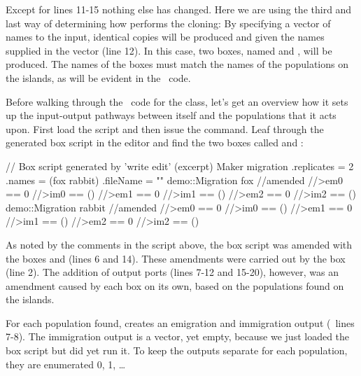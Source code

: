 Except for lines 11-15 nothing else has changed. Here we are using the third and last way of determining how  performs the cloning: By specifying a vector of names to the  input, identical copies will be produced and given the names supplied in the vector (line 12). In this case, two  boxes, named  and , will be produced. The names of the  boxes must match the names of the populations on the islands, as will be evident in the \CPP\ code.

Before walking through the \CPP\ code for the  class, let's get an overview how it sets up the input-output pathways between itself and the populations that it acts upon. First load the  script and then issue the  command. Leaf through the generated box script in the editor and find the two  boxes called  and :

\lstset{numbers=left}
\begin{boxscript}
// Box script generated by 'write edit' (excerpt)
Maker migration{
	.replicates = 2
	.names = (fox rabbit)
	.fileName = ""
	demo::Migration fox{ //amended
		//>em0 == 0
		//>im0 == ()
		//>em1 == 0
		//>im1 == ()
		//>em2 == 0
		//>im2 == ()
	}
	demo::Migration rabbit{ //amended
		//>em0 == 0
		//>im0 == ()
		//>em1 == 0
		//>im1 == ()
		//>em2 == 0
		//>im2 == ()
	}
}
\end{boxscript}
\lstset{numbers=none}

As noted by the comments in the script above, the box script was amended with the boxes  and  (lines 6 and 14). These amendments were carried out by the  box (line 2). The addition of output ports (lines 7-12 and 15-20), however, was an amendment caused by each  box on its own, based on the populations found on the islands. 

For each population found,  creates an emigration and immigration output (\eg\ lines 7-8). The immigration output is a vector, yet empty, because we just loaded the box script but did yet run it. To keep the outputs separate for each population, they are enumerated 0, 1, \ldots

